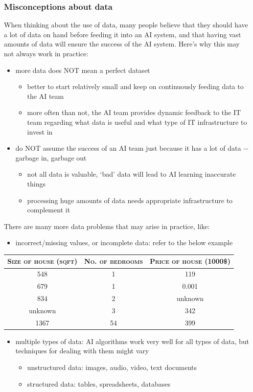 \documentclass{article}[a4paper,12pt]
\theoremstyle{definition}
\begin{document}
\subsubsection{Misconceptions about data}
When thinking about the use of data, many people believe that they should have a lot of data on hand before feeding it into an AI system, and that having vast amounts of data will ensure the success of the AI system. Here's why this may not always work in practice:
\begin{itemize}
	\item more data does NOT mean a perfect dataset
	\begin{itemize}
		\item better to start relatively small and keep on continuously feeding data to the AI team
		\item more often than not, the AI team provides dynamic feedback to the IT team regarding what data is useful and what type of IT infrastructure to invest in
	\end{itemize}
	\item do NOT assume the success of an AI team just because it has a lot of data $-$ garbage in, garbage out
	\begin{itemize}
		\item not all data is valuable, `bad' data will lead to AI learning inaccurate things
		\item processing huge amounts of data needs appropriate infrastructure to complement it
	\end{itemize}
\end{itemize}
There are many more data problems that may arise in practice, like:
\begin{itemize}
	\item incorrect/missing values, or incomplete data: refer to the below example
\end{itemize}
\begin{center}
\begin{tabular}{|c|c|c|}
\hline
\textsc{Size of house (sqft)} & \textsc{No. of bedrooms} & \textsc{Price of house} (1000\$)\\
\hline
548 & 1 & 119\\
\hline
679 & 1 & 0.001\\
\hline
834 & 2 & unknown\\
\hline
unknown & 3 & 342\\
\hline
1367 & 54 & 399\\
\hline
\end{tabular}
\end{center}
\begin{itemize}
	\item multiple types of data: AI algorithms work very well for all types of data, but techniques for dealing with them might vary
	\begin{itemize}
		\item unstructured data: images, audio, video, text documents
		\item structured data: tables, spreadsheets, databases
	\end{itemize}
\end{itemize}
\end{document}
